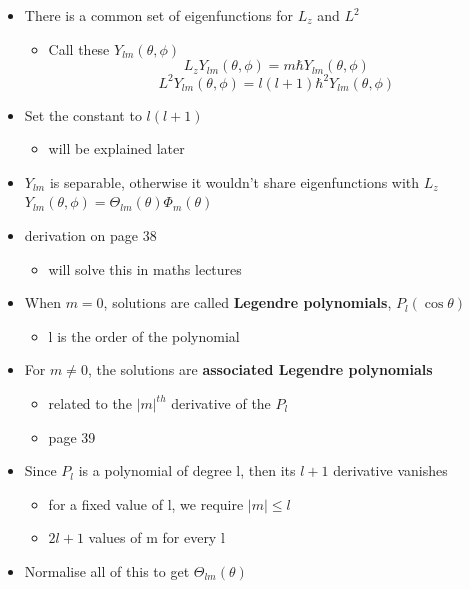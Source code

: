 \documentclass[a4paper,11pt,normalem]{article}
\begin{document}
\begin{itemize}
\item
  There is a common set of eigenfunctions for \(L_z\) and \(L^2\)
  \begin{itemize}
  \item
    Call these \(Y_{lm}(\theta, \phi)\) \[
    L_z Y_{lm}(\theta, \phi) = m\hbar Y_{lm}(\theta, \phi)
    \] \[
    L^2 Y_{lm}(\theta, \phi) = l(l + 1)\hbar^2 Y_{lm}(\theta, \phi)
    \]
  \end{itemize}
\item
  Set the constant to \(l(l + 1)\)
  \begin{itemize}
  \item
    will be explained later
  \end{itemize}
\item
  \(Y_{lm}\) is separable, otherwise it wouldn't share eigenfunctions
  with \(L_z\)
  \(Y_{lm}(\theta, \phi) = \Theta_{lm}(\theta)\Phi_{m}(\theta)\)
\item
  derivation on page 38
  \begin{itemize}
  \item
    will solve this in maths lectures
  \end{itemize}
\item
  When \(m = 0\), solutions are called \textbf{Legendre polynomials},
  \(P_{l}(\cos\theta)\)
  \begin{itemize}
  \item
    l is the order of the polynomial
  \end{itemize}
\item
  For \(m \neq 0\), the solutions are \textbf{associated Legendre
  polynomials}
  \begin{itemize}
  \item
    related to the \(|m|^{th}\) derivative of the \(P_l\)
  \item
    page 39
  \end{itemize}
\item
  Since \(P_l\) is a polynomial of degree l, then its \(l + 1\)
  derivative vanishes
  \begin{itemize}
  \item
    for a fixed value of l, we require \(|m| \leq l\)
  \item
    \(2l + 1\) values of m for every l
  \end{itemize}
\item
  Normalise all of this to get \(\Theta_{lm}(\theta)\)
\end{itemize}
\end{document}

